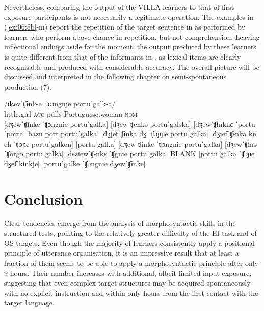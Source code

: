 Nevertheless, comparing the output of the VILLA learners to that of first-exposure participants is not necessarily a legitimate operation. The examples in (\ref{ex:06:5b}-m) report the repetition of the target sentence in  as performed by learners who perform above chance in repetition, but not comprehension. Leaving inflectional endings aside for the moment, the output produced by these learners is quite different from that of the informants in , as lexical items are clearly recognisable and produced with considerable accuracy. The overall picture will be discussed and interpreted in the following chapter on semi-spontaneous production (7).

\ea%
    \label{ex:06:5}
    \ea\label{ex:06:5a}
    \gll    /ʥevˈʧɨnk-e   ˈʨɔngnje   portuˈgalk-a/\\
            little.girl-\textsc{acc}   pulls     Portuguese.woman-\textsc{nom}\\
    \ex\label{ex:06:5b}
    [dʒewˈʧɨnke ˈʧɔngnie portuˈgalka]
    \ex\label{ex:06:5c}
    [dʒewˈʧenkə portuˈgalska]
    \ex\label{ex:06:5d}
    [dʒewˈʧɨnknɛ ˈportu ˈporta ˈbazu port portuˈgalka]
    \ex\label{ex:06:5e}
    [dʒjefˈʧɨnka dʒ ˈʧɔɲɲe portuˈgalka]
    \ex\label{ex:06:5f}
    [dʒjefˈʧɨnka kn eh ˈʧɔɲe portuˈgalkon]
    \ex\label{ex:06:5g}
    [portuˈgalka]
    \ex\label{ex:06:5h}
    [dʒewˈʧinke ˈʧɔngnie portuˈgalka]
    \ex\label{ex:06:5i}
    [dʒewˈʧɨnə ˈʧorgo portuˈgalka]
    \ex\label{ex:06:5j}
    [dsziewˈʧɨnkɛ ˈʧgnie portuˈgalka]
    \ex\label{ex:06:5k}
    BLANK
    \ex\label{ex:06:5l}
    [portuˈgalka ˈʧɔɲe dʒefˈkinkje]
    \ex\label{ex:06:5m}
    [portuˈgalke ˈʧɔngnie dʒewˈʧɨnke]
    \z
\z

\section{Conclusion}\label{sec:06:5}

Clear tendencies emerge from the analysis of morphosyntactic skills in the structured tests, pointing to the relatively greater difficulty of the EI task and of OS targets. Even though the majority of learners consistently apply a positional principle of utterance organisation, it is an impressive result that at least a fraction of them seems to be able to apply a morphosyntactic principle after only 9 hours. Their number increases with additional, albeit limited input exposure, suggesting that even complex target structures may be acquired spontaneously with no explicit instruction and within only hours from the first contact with the target language.
